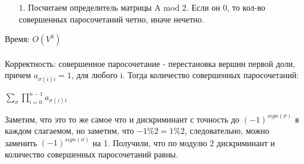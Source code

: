 \documentclass[12pt]{article} %
\begin{document}
	\begin{enumerate}
		\item[1.] Посчитаем определитель матрицы A mod 2. Если он 0, то кол-во совершенных паросочетаний четно, иначе нечетно.
	\end{enumerate}
	Время: $O(V^3)$\\
	\\
	Корректность: совершенное паросочетание - перестановка вершин первой доли, причем $a_{\sigma(i)i} = 1$, для любого i. Тогда количество совершенных паросочетаний: \\
	\begin{center}
		$\sum_{\sigma}{\prod_{i = 0}^{n - 1}{a_{\sigma(i)i}}}$\\
	\end{center}
	Заметим, что это то же самое что и дискриминант с точность до $(-1)^{sign(\sigma)}$ в каждом слагаемом, но заметим, что $-1 \% 2 = 1 \% 2$, следовательно, можно заменить  $(-1)^{sign(\sigma)}$ на 1. Получили, что по модулю 2 дискриминант и количество совершенных паросочетаний равны.\\
\end{document}
